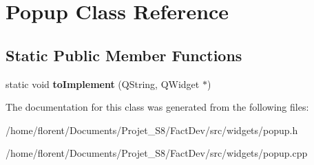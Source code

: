 \hypertarget{classPopup}{\section{Popup Class Reference}
\label{classPopup}
}
\subsection*{Static Public Member Functions}
\begin{DoxyCompactItemize}
\item 
\hypertarget{classPopup_aa3173e0f473b42f08363c4ef17c93a07}{static void {\bfseries to\-Implement} (Q\-String, Q\-Widget $\ast$)}\label{classPopup_aa3173e0f473b42f08363c4ef17c93a07}

\end{DoxyCompactItemize}


The documentation for this class was generated from the following files\-:\begin{DoxyCompactItemize}
\item 
/home/florent/\-Documents/\-Projet\-\_\-\-S8/\-Fact\-Dev/src/widgets/popup.\-h\item 
/home/florent/\-Documents/\-Projet\-\_\-\-S8/\-Fact\-Dev/src/widgets/popup.\-cpp\end{DoxyCompactItemize}
